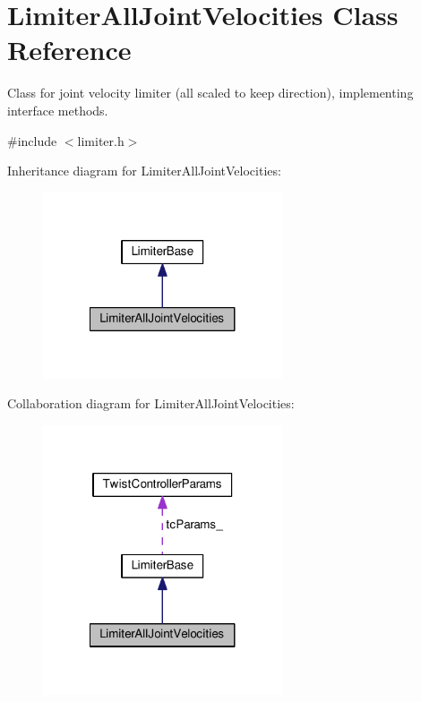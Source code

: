 \hypertarget{classLimiterAllJointVelocities}{\section{Limiter\-All\-Joint\-Velocities Class Reference}
\label{classLimiterAllJointVelocities}
}


Class for joint velocity limiter (all scaled to keep direction), implementing interface methods.  




{\ttfamily \#include $<$limiter.\-h$>$}



Inheritance diagram for Limiter\-All\-Joint\-Velocities\-:
\nopagebreak
\begin{figure}[H]
\begin{center}
\leavevmode
\includegraphics[width=200pt]{classLimiterAllJointVelocities__inherit__graph}
\end{center}
\end{figure}


Collaboration diagram for Limiter\-All\-Joint\-Velocities\-:
\nopagebreak
\begin{figure}[H]
\begin{center}
\leavevmode
\includegraphics[width=200pt]{classLimiterAllJointVelocities__coll__graph}
\end{center}
\end{figure}
